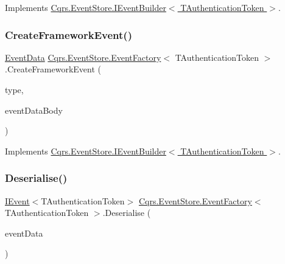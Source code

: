 Implements \hyperlink{interfaceCqrs_1_1EventStore_1_1IEventBuilder_a341d5c54ef8a271a8248e0a5266e6228_a341d5c54ef8a271a8248e0a5266e6228}{Cqrs.\+Event\+Store.\+I\+Event\+Builder$<$ T\+Authentication\+Token $>$}.

\mbox{\label{classCqrs_1_1EventStore_1_1EventFactory_a9e04e262a8af8f60bdde7b4bf3eafebb_a9e04e262a8af8f60bdde7b4bf3eafebb}} 
\subsubsection{\texorpdfstring{Create\+Framework\+Event()}{CreateFrameworkEvent()}\hspace{0.1cm}{\footnotesize\ttfamily [4/4]}}
{\footnotesize\ttfamily \hyperlink{classCqrs_1_1Events_1_1EventData}{Event\+Data} \hyperlink{classCqrs_1_1EventStore_1_1EventFactory}{Cqrs.\+Event\+Store.\+Event\+Factory}$<$ T\+Authentication\+Token $>$.Create\+Framework\+Event (\begin{DoxyParamCaption}\item[{string}]{type,  }\item[{string}]{event\+Data\+Body }\end{DoxyParamCaption})}



Implements \hyperlink{interfaceCqrs_1_1EventStore_1_1IEventBuilder_a8e3df7af1f54ac873d1a768b78b82c6d_a8e3df7af1f54ac873d1a768b78b82c6d}{Cqrs.\+Event\+Store.\+I\+Event\+Builder$<$ T\+Authentication\+Token $>$}.

\mbox{\label{classCqrs_1_1EventStore_1_1EventFactory_abfd04f6833e4f010234d84a591f6eb6b_abfd04f6833e4f010234d84a591f6eb6b}} 
\subsubsection{\texorpdfstring{Deserialise()}{Deserialise()}\hspace{0.1cm}{\footnotesize\ttfamily [1/2]}}
{\footnotesize\ttfamily \hyperlink{interfaceCqrs_1_1Events_1_1IEvent}{I\+Event}$<$T\+Authentication\+Token$>$ \hyperlink{classCqrs_1_1EventStore_1_1EventFactory}{Cqrs.\+Event\+Store.\+Event\+Factory}$<$ T\+Authentication\+Token $>$.Deserialise (\begin{DoxyParamCaption}\item[{Recorded\+Event}]{event\+Data }\end{DoxyParamCaption})}



